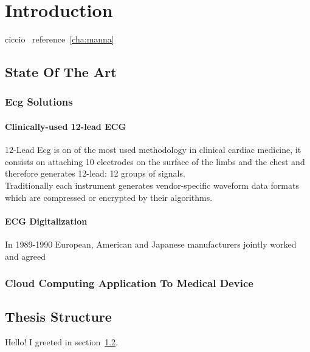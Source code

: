 
\chapter{Introduction}
ciccio~\label{cha:manna}
reference~\ref{cha:manna}

\section{State Of The Art}
\subsection{Ecg Solutions}
\subsubsection{Clinically-used 12-lead ECG}
12-Lead Ecg is on of the most used methodology in clinical cardiac medicine, it consists on attaching 10 electrodes on the surface of the limbs and the chest and therefore generates 12-lead: 12 groups of signals.\\
Traditionally each instrument generates vendor-specific waveform data formats which are compressed or encrypted by their algorithms.\cite{Hsieh2012}
\subsubsection{ECG Digitalization}
In 1989-1990 European, American and Japanese manufacturers jointly worked and agreed \cite{Chronaki} 
\subsection{Cloud Computing Application To Medical Device}


\section{Thesis Structure}
\label{sec:greetings}

Hello!
I greeted in section~\ref{sec:greetings}.